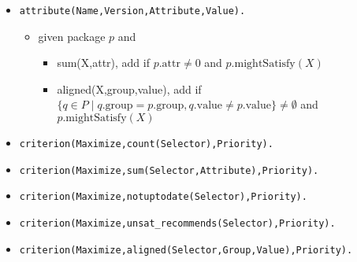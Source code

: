 \documentclass[a4paper,english]{article}
\begin{document}
\begin{itemize}
\begin{itemize}
    \end{itemize}
  \item \texttt{attribute(Name,Version,Attribute,Value).}
    \begin{itemize}
      \item given package $p$ and
        \begin{itemize}
          \item sum(X,attr), add if $p.\mathrm{attr}\not=0$ and $p.\mathrm{mightSatisfy}(X)$
          \item aligned(X,group,value), add if $\{q\in P \mid q.\mathrm{group} = p.\mathrm{group}, q.\mathrm{value} \neq p.\mathrm{value}\}\not=\emptyset$ and $p.\mathrm{mightSatisfy}(X)$
        \end{itemize}
    \end{itemize}
  \item \texttt{criterion(Maximize,count(Selector),Priority).}
  \item \texttt{criterion(Maximize,sum(Selector,Attribute),Priority).}
  \item \texttt{criterion(Maximize,notuptodate(Selector),Priority).}
  \item \texttt{criterion(Maximize,unsat\_recommends(Selector),Priority).}
  \item \texttt{criterion(Maximize,aligned(Selector,Group,Value),Priority).}
\end{itemize}
\end{document}
